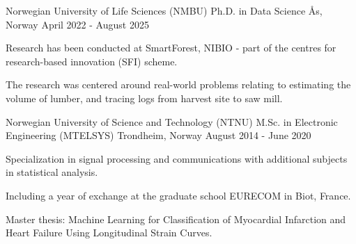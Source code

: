 \begin{cventries}
    \cventry
        {Norwegian University of Life Sciences (NMBU)}
        {Ph.D. in Data Science}
        {Ås, Norway}
        {April 2022 - August 2025}
        {
          \begin{cvitems}
            \item {Research has been conducted at SmartForest, NIBIO - part of the centres for research-based innovation (SFI) scheme.}
            \item {The research was centered around real-world problems relating to estimating the volume of lumber, and tracing logs from harvest site to saw mill.} %
          \end{cvitems}
        }
    \cventry
        {Norwegian University of Science and Technology (NTNU)}
        {M.Sc. in Electronic Engineering (MTELSYS)}
        {Trondheim, Norway}
        {August 2014 - June 2020}
        {
          \begin{cvitems}
            \item {Specialization in signal processing and communications with additional subjects in statistical analysis.}
            \item {Including a year of exchange at the graduate school EURECOM in Biot, France.}
            \item {Master thesis: Machine Learning for Classification of Myocardial Infarction and Heart Failure Using Longitudinal Strain Curves.}
          \end{cvitems}
        }
\end{cventries}